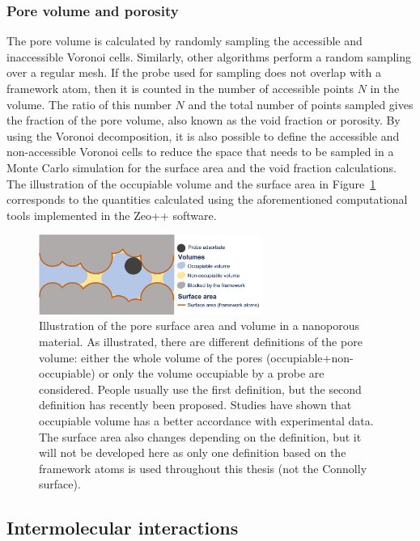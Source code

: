 \documentclass[main.tex]{subfiles}
\begin{document}
\subsubsection{Pore volume and porosity}

The pore volume is calculated by randomly sampling the accessible and inaccessible Voronoi cells. Similarly, other algorithms perform a random sampling over a regular mesh. If the probe used for sampling does not overlap with a framework atom, then it is counted in the number of accessible points $N$ in the volume. The ratio of this number $N$ and the total number of points sampled gives the fraction of the pore volume, also known as the void fraction or porosity. By using the Voronoi decomposition, it is also possible to define the accessible and non-accessible Voronoi cells to reduce the space that needs to be sampled in a Monte Carlo simulation for the surface area and the void fraction calculations. The illustration of the occupiable volume and the surface area in Figure~\ref{fgr:pores} corresponds to the quantities calculated using the aforementioned computational tools implemented in the Zeo++ software.\autocite{Zeo++}

\begin{figure}[ht!]
  \centering
  \includegraphics[width=0.65\textwidth]{figures/1-screening/Pore_descriptors.jpg}
  \caption{Illustration of the pore surface area and volume in a nanoporous material. As illustrated, there are different definitions of the pore volume: either the whole volume of the pores (occupiable+non-occupiable) or only the volume occupiable by a probe are considered. People usually use the first definition, but the second definition has recently been proposed. Studies have shown that occupiable volume has a better accordance with experimental data.\autocite{vol_Ongari2017} The surface area also changes depending on the definition, but it will not be developed here as only one definition based on the framework atoms is used throughout this thesis (not the Connolly surface).}\label{fgr:pores}
\end{figure}


\subsection{Intermolecular interactions}\label{sct:interaction}
\end{document}
